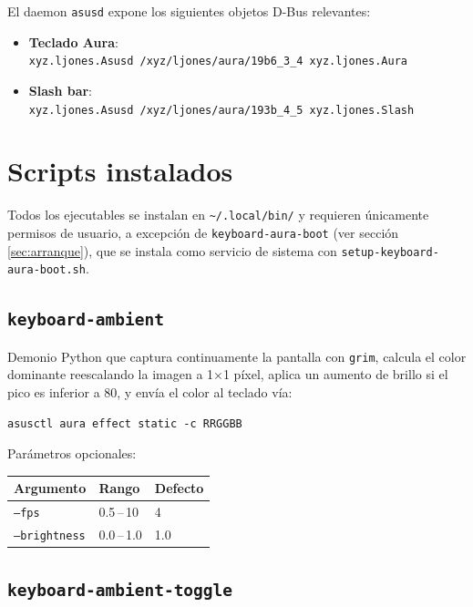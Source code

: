 \documentclass[12pt,a4paper]{article}
\begin{document}
El daemon \texttt{asusd} expone los siguientes objetos D-Bus relevantes:

\begin{itemize}[nosep]
  \item \textbf{Teclado Aura}:\\
        \texttt{xyz.ljones.Asusd /xyz/ljones/aura/19b6\_3\_4 xyz.ljones.Aura}
  \item \textbf{Slash bar}:\\
        \texttt{xyz.ljones.Asusd /xyz/ljones/aura/193b\_4\_5 xyz.ljones.Slash}
\end{itemize}

\section{Scripts instalados}

Todos los ejecutables se instalan en \texttt{\textasciitilde/.local/bin/} y
requieren únicamente permisos de usuario, a excepción de
\texttt{keyboard-aura-boot} (ver sección \ref{sec:arranque}), que se instala
como servicio de sistema con \texttt{setup-keyboard-aura-boot.sh}.

\subsection{\texttt{keyboard-ambient}}

Demonio Python que captura continuamente la pantalla con \texttt{grim}, calcula
el color dominante reescalando la imagen a 1×1 píxel, aplica un aumento de
brillo si el pico es inferior a 80, y envía el color al teclado vía:

\begin{lstlisting}[style=bash]
asusctl aura effect static -c RRGGBB
\end{lstlisting}

Parámetros opcionales:

\begin{center}
\begin{tabular}{lll}
  \toprule
  Argumento & Rango & Defecto \\
  \midrule
  \texttt{--fps} & 0.5\,--\,10 & 4 \\
  \texttt{--brightness} & 0.0\,--\,1.0 & 1.0 \\
  \bottomrule
\end{tabular}
\end{center}

\subsection{\texttt{keyboard-ambient-toggle}}
\end{document}

